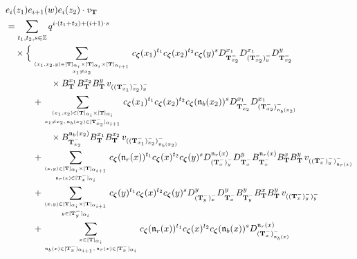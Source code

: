 \documentclass[12pt]{amsart}
\numberwithin{equation}{thm}
\newcommand\ZZ{\mathbb Z}
\newcommand\bT{\mathbf T}
\newcommand\fn{\mathfrak n}
\renewcommand\a{\alpha}  %
\newcommand\Bz{\boldsymbol\zeta}
\begin{document}
%
\begin{align}
\label{e_iz1 ei+1w e_iz2 vbT} 
& e_i(z_1) e_{i+1} (w) e_i(z_2) \cdot v_{\bT} 
\\
&\notag 
= \sum_{t_1,t_2, s \in \ZZ} q^{ i \cdot (t_1 + t_2) + (i+1) \cdot s} 
	\\ \notag & \quad \times \Big\{  
		\sum_{( x_1, x_2, y) \in [\bT]_{\a_i} \times [\bT]_{\a_i} \times [\bT]_{\a_{i+1}} \atop x_1 \not= x_2 } 
		c_{\Bz} (x_1)^{t_1} c_{\Bz} (x_2)^{t_2} c_{\Bz} (y)^s 
		D_{\bT_{x_2}^-}^{x_1} D_{(\bT_{x_2}^-)_y^-}^{x_1} D_{\bT_{x_2}^-}^y 
		\\\notag  & \hspace{5em} \times 
		B_{\bT}^{x_1} B_{\bT}^{x_2} B_{\bT}^y \, v_{((\bT_{x_1}^-)_{x_2}^-)_y^-} 
	\\ \notag & \hspace{3em} 
	+ \sum_{(x_1,x_2) \in [\bT]_{\a_i} \times [\bT]_{\a_i} \atop x_1 \not= x_2, \, \fn_b (x_2) \in [\bT_{x_2}^-]_{\a_{i+1}}} 
		c_{\Bz} (x_1)^{t_1} c_{\Bz} (x_2)^{t_2} c_{\Bz} (\fn_b (x_2))^s 
		D_{\bT_{x_2}^-}^{x_1} D_{(\bT_{x_2}^-)_{\fn_b (x_2)}^-}^{x_1} 
		\\ \notag & \hspace{5em} \times 
		B_{\bT_{x_2}^-}^{\fn_b (x_2)} B_{\bT}^{x_1} B_{\bT}^{x_2} \, v_{((\bT_{x_1}^-)_{x_2}^-)_{\fn_b(x_2)}^-} 
	\\\notag  & \hspace{3em} 
	+ \sum_{(x,y) \in [\bT]_{\a_i} \times [\bT]_{\a_{i+1}} \atop \fn_r(x) \in [\bT_x^-]_{\a_i}} 
		c_{\Bz} (\fn_r (x))^{t_1} c_{\Bz} (x)^{t_2} c_{\Bz} (y)^s 
		D_{(\bT_{x}^-)_y^-}^{\fn_r (x)} D_{\bT_x^-}^y 
		B_{\bT_x^-}^{\fn_r(x)} B_{\bT}^x B_{\bT}^y \, v_{((\bT_x^-)_y^-)_{\fn_r(x)}^-} 
	\\ \notag & \hspace{3em} 
	+ \sum_{(x,y) \in [\bT]_{\a_i} \times [\bT]_{\a_{i+1}} \atop y \in [\bT_y^-]_{\a_i}} 
		c_{\Bz} (y)^{t_1} c_{\Bz}(x)^{t_2} c_{\Bz}(y)^s 
		D_{(\bT_y^-)_x^-}^y D_{\bT_x^-}^y 
		B_{\bT_y^-}^y B_{\bT}^x B_{\bT}^y \, v_{((\bT_x^-)_y^-)_y^-} 
	\\ \notag & \hspace{3em} 
	+ \sum_{ x \in [\bT]_{\a_i} \atop \fn_b(x) \in [\bT_x^-]_{\a_{i+1}}, \, \fn_r (x) \in [\bT_x^-]_{\a_i}} 
		c_{\Bz} (\fn_r (x))^{t_1} c_{\Bz} (x)^{t_2} c_{\Bz}( \fn_b (x))^s 
		D_{(\bT_x^-)_{\fn_b(x)}^-}^{\fn_r (x)} 

\end{align}
\end{document}
